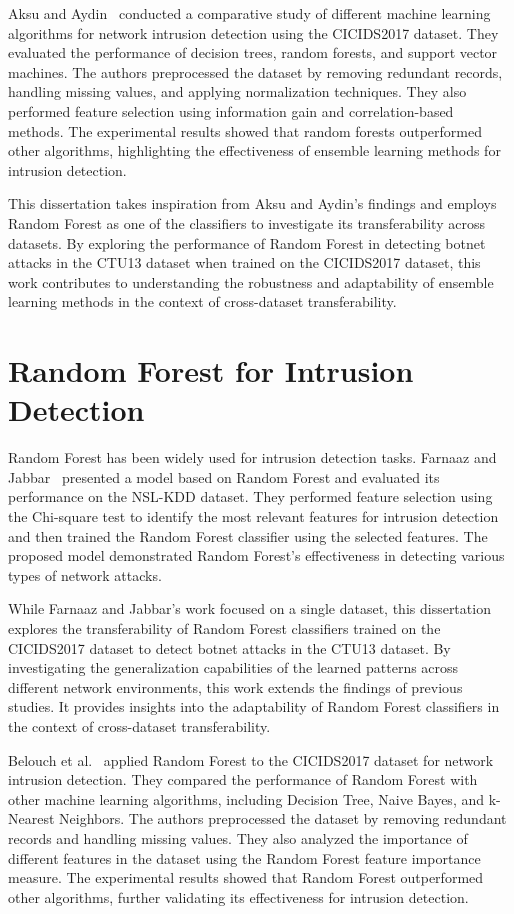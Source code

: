 Aksu and Aydin~\cite{aksu2018detecting} conducted a comparative study of different machine learning algorithms for network intrusion detection using the CICIDS2017 dataset. They evaluated the performance of decision trees, random forests, and support vector machines. The authors preprocessed the dataset by removing redundant records, handling missing values, and applying normalization techniques. They also performed feature selection using information gain and correlation-based methods. The experimental results showed that random forests outperformed other algorithms, highlighting the effectiveness of ensemble learning methods for intrusion detection.

This dissertation takes inspiration from Aksu and Aydin’s findings and employs Random Forest as one of the classifiers to investigate its transferability across datasets. By exploring the performance of Random Forest in detecting botnet attacks in the CTU13 dataset when trained on the CICIDS2017 dataset, this work contributes to understanding the robustness and adaptability of ensemble learning methods in the context of cross-dataset transferability.

\section{Random Forest for Intrusion Detection}

Random Forest has been widely used for intrusion detection tasks. Farnaaz and Jabbar~\cite{farnaaz2016random} presented a model based on Random Forest and evaluated its performance on the NSL-KDD dataset. They performed feature selection using the Chi-square test to identify the most relevant features for intrusion detection and then trained the Random Forest classifier using the selected features. The proposed model demonstrated Random Forest’s effectiveness in detecting various types of network attacks.

While Farnaaz and Jabbar’s work focused on a single dataset, this dissertation explores the transferability of Random Forest classifiers trained on the CICIDS2017 dataset to detect botnet attacks in the CTU13 dataset. By investigating the generalization capabilities of the learned patterns across different network environments, this work extends the findings of previous studies. It provides insights into the adaptability of Random Forest classifiers in the context of cross-dataset transferability.

Belouch et al.~\cite{belouch2018performance} applied Random Forest to the CICIDS2017 dataset for network intrusion detection. They compared the performance of Random Forest with other machine learning algorithms, including Decision Tree, Naive Bayes, and k-Nearest Neighbors. The authors preprocessed the dataset by removing redundant records and handling missing values. They also analyzed the importance of different features in the dataset using the Random Forest feature importance measure. The experimental results showed that Random Forest outperformed other algorithms, further validating its effectiveness for intrusion detection.

